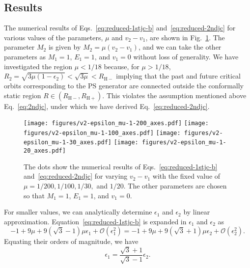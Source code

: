 \documentclass[prd,showpacs,preprintnumbers,groupedaddress,superscriptaddress,nofootinbib,11pt]{revtex4-1} %
\theoremstyle{newplain}
\begin{document}
\subsection{Results}
The numerical results of Eqs.~\eqref{eq:reduced-1stjc-b} and~\eqref{eq:reduced-2ndjc} for various values of the parameters, $\mu$ and $v_2-v_1$, are shown in Fig.~\ref{fig:epsilon-results}.
The parameter $M_2$ is given by $M_2=\mu(v_2-v_1)$, and we can take the other parameters as $M_1=1$, $E_1=1$, and $v_1=0$ without loss of generality.
We have investigated the region $\mu<1/18$ because, for $\mu>1/18$, $R_2=\sqrt{3\mu(1-\epsilon_2)}<\sqrt{3\mu}<R_{\mathrm{H}-}$ implying that the past and future critical orbits corresponding to the PS generator are connected outside the conformally static region $R\in(R_{\mathrm{H}-},R_{\mathrm{H}+})$.
This violates the assumption mentioned above Eq.~\eqref{eq:2ndjc}, under which we have derived Eq.~\eqref{eq:reduced-2ndjc}.
\begin{figure}[h]
\centering
\texttt{[image: figures/v2-epsilon\_mu-1-200\_axes.pdf]}
\texttt{[image: figures/v2-epsilon\_mu-1-100\_axes.pdf]}
\texttt{[image: figures/v2-epsilon\_mu-1-30\_axes.pdf]}
\texttt{[image: figures/v2-epsilon\_mu-1-20\_axes.pdf]}
\caption{
\label{fig:epsilon-results} 
The dots show the numerical results of Eqs.~\eqref{eq:reduced-1stjc-b} and~\eqref{eq:reduced-2ndjc} for varying $v_2-v_1$ with the fixed value of $\mu=1/200, 1/100, 1/30,$ and $1/20$.
The other parameters are chosen so that $M_1=1$, $E_1=1$, and $v_1=0$.
}
\end{figure}
\par
For smaller values, we can analytically determine $\epsilon_1$ and $\epsilon_2$ by linear approximation.
Equation~\eqref{eq:reduced-1stjc-b} is expanded in $\epsilon_1$ and $\epsilon_2$ as
\begin{equation}
-1+9\mu+9\left(\sqrt{3}-1\right)\mu\epsilon_1+\mathcal{O}\left(\epsilon_1^2\right)
=-1+9\mu+9\left(\sqrt{3}+1\right)\mu\epsilon_2+\mathcal{O}\left(\epsilon_2^2\right).
\end{equation}
Equating their orders of magnitude, we have
\begin{equation}
\label{eq:epsilon-ratio}
\epsilon_1=\frac{\sqrt{3}+1}{\sqrt{3}-1}\epsilon_2.
\end{equation}
\end{document}
